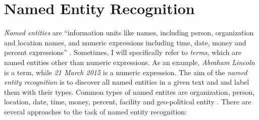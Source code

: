 \documentclass[a4paper, 12pt, twoside]{fithesis2}		%
\renewcommand{\_}{\leavevmode \kern0.07em\vbox{\hrule width0.4em}}
\begin{document}



\section{Named Entity Recognition}
\label{sec:terms-extraction}
\textit{Named entities}
are ``information units like names, including person, organization and location names, and numeric expressions including time, date, money and percent expressions'' \autocite{named-entity-recognition}.
Sometimes, I will specifically refer to \textit{terms}, which are named entities other than numeric expressions.
As an example, \textit{Abraham Lincoln} is a term, while \textit{21 March 2015} is a numeric expression.
The aim of the \textit{named entity recognition} is to discover all named entities in a given text and and label them with their types. Common types of named entites are organization, person, location, date, time, money, percent, facility and geo-political entity \cite[][281]{nlp-python}. There are several approaches to the task of named entity recognition:
\end{document}
